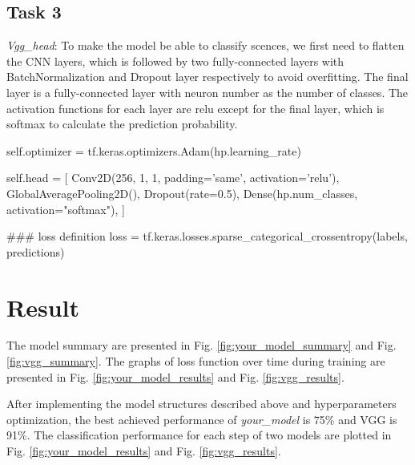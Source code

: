 \subsection*{Task 3}

\emph{Vgg\_head}: To make the model be able to classify scences, we first need to flatten the CNN layers, which is followed by two fully-connected layers with BatchNormalization and Dropout layer respectively to avoid overfitting. The final layer is a fully-connected layer with neuron number as the number of classes. The activation functions for each layer are relu except for the final layer, which is softmax to calculate the prediction probability.
    \begin{python}
self.optimizer = tf.keras.optimizers.Adam(hp.learning_rate)

self.head = [
    Conv2D(256, 1, 1, padding='same', activation='relu'),
    GlobalAveragePooling2D(),
    Dropout(rate=0.5),
    Dense(hp.num_classes, activation="softmax"),
  ]
  
### loss definition
loss = tf.keras.losses.sparse_categorical_crossentropy(labels, predictions)
    \end{python}

\section*{Result}

The model summary are presented in Fig. \ref{fig:your_model_summary} and Fig. \ref{fig:vgg_summary}. The graphs of loss function over time during training are presented in Fig. \ref{fig:your_model_results} and Fig. \ref{fig:vgg_results}.

After implementing the model structures described above and hyperparameters optimization, the best achieved performance of \emph{your\_model} is 75\% and VGG is 91\%. The classification performance for each step of two models are plotted in Fig. \ref{fig:your_model_results} and Fig. \ref{fig:vgg_results}.

